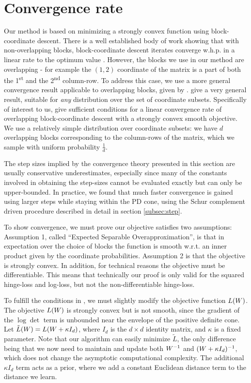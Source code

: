 \documentclass{article}
\begin{document}
\section{Convergence rate}
Our method is based on minimizing a strongly convex function using block-coordinate descent. There is a well established body of work showing that with non-overlapping blocks, block-coordinate descent iterates converge w.h.p. in a linear rate to the optimum value \cite{nesterov2012efficiency,richtarik2014iteration}.
However, the blocks we use in our method are overlapping - for example the $(1,2)$ coordinate of the matrix is a part of both the 1\textsuperscript{st} and the 2\textsuperscript{nd} column-row. To address this case, we use a more general convergence result applicable to overlapping blocks, given by \citet{richtarik2013optimal}. \citeauthor{richtarik2013optimal} give a very general result, suitable for \emph{any} distribution over the set of coordinate subsets. 
Specifically of interest to us, \citeauthor{richtarik2013optimal} give sufficient conditions for a linear convergence rate of overlapping block-coordinate descent with a strongly convex smooth objective. We use a relatively simple distribution over coordinate subsets: we have $d$ overlapping blocks corresponding to the column-rows of the matrix, which we sample with uniform probability $\frac{1}{d}$.

The step sizes implied by the convergence theory presented in this section are usually conservative underestimates, especially since many of the constants involved in obtaining the step-sizes cannot be evaluated exactly but can only be upper-bounded. In practice, we found that much faster convergence is gained using larger steps while staying within the PD cone, using the Schur complement driven procedure described in detail in section \ref{subsec:step}.

To show convergence, we must prove our objective satisfies two assumptions: Assumption 1, called ``Expected Separable Overapproximation'', is that in expectation over the choice of blocks the function is smooth w.r.t. an inner product given by the coordinate probabilities. Assumption 2 is that the objective is strongly convex. In addition, for technical reasons the objective must be differentiable. This means that technically our proof is only valid for the squared hinge-loss and log-loss, but not the non-differentiable hinge-loss.

To fulfill the conditions in \cite{richtarik2013optimal}, we must slightly modify the objective function $L({{W}})$. The objective $L({W})$ is strongly convex but is not smooth, since the gradient of the $\log \det$ term is unbounded near the envelope of the positive definite cone. Let $\tilde{L}({{W}}) = L({{W} + \kappa I_d})$, where $I_d$ is the $d \times d$ identity matrix, and $\kappa$ is a fixed parameter.
Note that our algorithm can easily minimize $\tilde{L}$, the only difference being that we now need to maintain and update both ${W}^{-1}$ and $({W}+\kappa I_d)^{-1}$, which does not change the asymptotic computational complexity. The additional $\kappa I_d$ term acts as a prior, where we add a constant Euclidean distance term to the distance we learn. 
\end{document}
